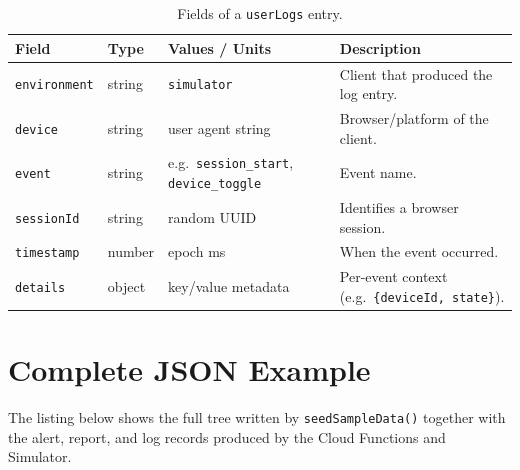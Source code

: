 \documentclass[11pt,a4paper]{article}
\begin{document}
\begin{table}[H]
\centering
\caption{Fields of a \texttt{userLogs} entry.}
\label{tab:userlogs}
\begin{tabularx}{\textwidth}{@{}l l X X@{}}
\toprule
\textbf{Field} & \textbf{Type} & \textbf{Values / Units} & \textbf{Description} \\
\midrule
\texttt{environment} & string & \texttt{simulator} & Client that produced the log entry. \\
\texttt{device} & string & user agent string & Browser/platform of the client. \\
\texttt{event} & string & e.g.\ \texttt{session\_start}, \texttt{device\_toggle} & Event name. \\
\texttt{sessionId} & string & random UUID & Identifies a browser session. \\
\texttt{timestamp} & number & epoch ms & When the event occurred. \\
\texttt{details} & object & key/value metadata & Per-event context (e.g.\ \texttt{\{deviceId, state\}}). \\
\bottomrule
\end{tabularx}
\end{table}

\section{Complete JSON Example}
\label{sec:example}

The listing below shows the full tree written by \texttt{seedSampleData()} together with the
alert, report, and log records produced by the Cloud Functions and Simulator.
\end{document}
